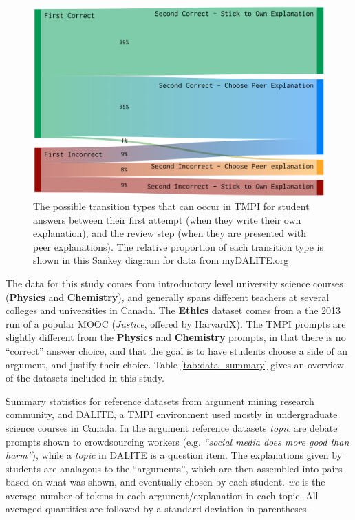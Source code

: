 \documentclass[notitlepage,12pt]{jedm}
\begin{document}
\begin{figure}[H]
	\centering
	\includegraphics[width=0.7\linewidth]{img/transitions_final.png}
	\caption{The possible transition types that can occur in TMPI for student 
		answers between their first attempt (when they write their own 
		explanation), and the review step (when they are presented with peer 
		explanations). 
		The relative proportion of each transition type is shown in this Sankey 
		diagram for data from myDALITE.org}
	\label{fig:tmpi_sankey}
\end{figure}


The data for this study comes from introductory level university science 
courses (\textbf{Physics} and \textbf{Chemistry}), and generally spans 
different teachers at several colleges and universities in Canada. 
The \textbf{Ethics} dataset comes from a the 2013 run of a popular MOOC 
(\textit{Justice}, offered by HarvardX).
The TMPI prompts are slightly different from the \textbf{Physics} and 
\textbf{Chemistry} prompts, in that there is no ``correct'' answer choice, and 
that the goal is to have students choose a side of an argument, and justify 
their choice.
Table \ref{tab:data_summary} gives an overview of the datasets included in this 
study.


\begin{table}
	\caption{
		Summary statistics for reference datasets from argument mining research 
		community, and DALITE, a TMPI environment used mostly in undergraduate 
		science courses in Canada. 
		In the argument reference datasets \textit{topic} are debate prompts 
		shown to crowdsourcing workers (e.g. \textit{``social media does more 
			good than harm''}), while a \textit{topic} in DALITE is a question 
			item.
		The explanations given by students are analagous to the ``arguments'',  
		which are then assembled into pairs based on what was shown, and 
		eventually chosen by each student.
		\textit{wc} is the average number of tokens in each 
		argument/explanation in each topic.
		All averaged quantities are followed by a standard deviation in 
		parentheses.
	}
	\label{tab:data_summary}
	
\end{table}
\end{document}
